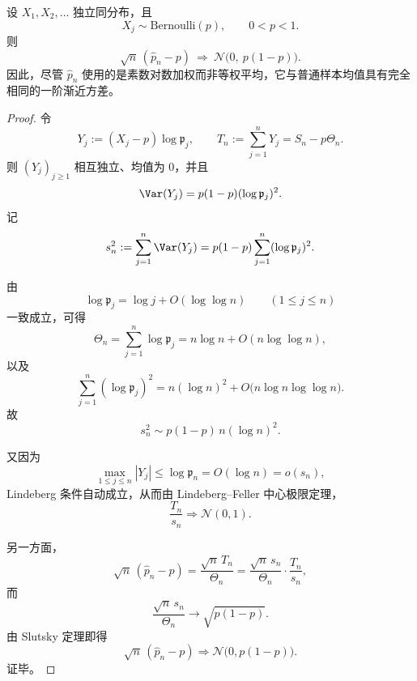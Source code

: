 \begin{theorem}\label{thm:fold-godel-density-estimator-clt-efficient}
设 \(X_1,X_2,\dots\) 独立同分布，且
\[
X_j\sim \mathrm{Bernoulli}(p),
\qquad 0<p<1.
\]
则
\[
\sqrt n\,(\widehat p_n-p)\ \Rightarrow\ \mathcal N\!\bigl(0,\ p(1-p)\bigr).
\]
因此，尽管 \(\widehat p_n\) 使用的是素数对数加权而非等权平均，它与普通样本均值具有完全相同的一阶渐近方差。
\end{theorem}
\begin{proof}
令
\[
Y_j:=(X_j-p)\log \mathfrak p_j,
\qquad
T_n:=\sum_{j=1}^{n}Y_j=S_n-p\Theta_n.
\]
则 \((Y_j)_{j\ge 1}\) 相互独立、均值为 \(0\)，并且
\[
\Var(Y_j)=p(1-p)(\log \mathfrak p_j)^2.
\]
记
\[
s_n^2:=\sum_{j=1}^{n}\Var(Y_j)=p(1-p)\sum_{j=1}^{n}(\log \mathfrak p_j)^2.
\]

由
\[
\log \mathfrak p_j=\log j+O(\log\log n)
\qquad (1\le j\le n)
\]
一致成立，可得
\[
\Theta_n=\sum_{j=1}^{n}\log \mathfrak p_j
=
n\log n+O(n\log\log n),
\]
以及
\[
\sum_{j=1}^{n}(\log \mathfrak p_j)^2
=
n(\log n)^2+O\bigl(n\log n\log\log n\bigr).
\]
故
\[
s_n^2\sim p(1-p)\,n(\log n)^2.
\]

又因为
\[
\max_{1\le j\le n}|Y_j|
\le
\log \mathfrak p_n
=
O(\log n)
=
o(s_n),
\]
Lindeberg 条件自动成立，从而由 Lindeberg--Feller 中心极限定理，
\[
\frac{T_n}{s_n}\Rightarrow \mathcal N(0,1).
\]

另一方面，
\[
\sqrt n\,(\widehat p_n-p)
=
\frac{\sqrt n\,T_n}{\Theta_n}
=
\frac{\sqrt n\,s_n}{\Theta_n}\cdot \frac{T_n}{s_n},
\]
而
\[
\frac{\sqrt n\,s_n}{\Theta_n}
\to
\sqrt{p(1-p)}.
\]
由 Slutsky 定理即得
\[
\sqrt n\,(\widehat p_n-p)\Rightarrow \mathcal N\!\bigl(0,p(1-p)\bigr).
\]
证毕。
\end{proof}

